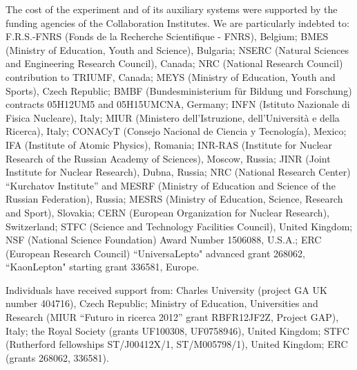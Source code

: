 The cost of the experiment and of its auxiliary systems were supported by the funding agencies of
the Collaboration Institutes. We are particularly indebted to:
F.R.S.-FNRS (Fonds de la Recherche Scientifique - FNRS), Belgium;
BMES (Ministry of Education, Youth and Science), Bulgaria;
NSERC (Natural Sciences and Engineering Research Council), Canada;
NRC (National Research Council) contribution to TRIUMF, Canada;
MEYS (Ministry of Education, Youth and Sports),  Czech Republic;
BMBF (Bundesministerium f\"{u}r Bildung und Forschung) contracts 05H12UM5 and 05H15UMCNA, Germany;
INFN  (Istituto Nazionale di Fisica Nucleare), Italy;
MIUR (Ministero dell'Istruzione, dell'Universit\`a e della Ricerca),  Italy;
CONACyT  (Consejo Nacional de Ciencia y Tecnolog\'{i}a),  Mexico;
IFA (Institute of Atomic Physics),  Romania;
INR-RAS (Institute for Nuclear Research of the Russian Academy of Sciences), Moscow, Russia;
JINR (Joint Institute for Nuclear Research), Dubna, Russia;
NRC (National Research Center)  ``Kurchatov Institute'' and MESRF (Ministry of Education and Science of the Russian Federation), Russia;
MESRS  (Ministry of Education, Science, Research and Sport), Slovakia;
CERN (European Organization for Nuclear Research), Switzerland;
STFC (Science and Technology Facilities Council), United Kingdom;
NSF (National Science Foundation) Award Number 1506088,   U.S.A.;
ERC (European Research Council)  ``UniversaLepto" advanced grant 268062, ``KaonLepton" starting grant 336581, Europe.

Individuals have received support from:
Charles University (project GA UK number 404716), Czech Republic;
Ministry of Education, Universities and Research (MIUR  ``Futuro in ricerca 2012''  grant RBFR12JF2Z, Project GAP), Italy;
the Royal Society (grants UF100308, UF0758946), United Kingdom;
STFC (Rutherford fellowships ST/J00412X/1, ST/M005798/1), United Kingdom;
ERC (grants 268062,  336581).


